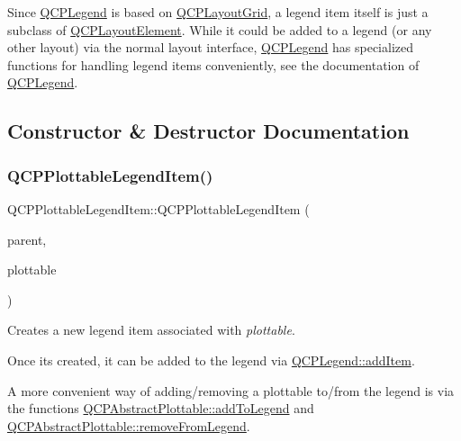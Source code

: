 Since \hyperlink{classQCPLegend}{Q\+C\+P\+Legend} is based on \hyperlink{classQCPLayoutGrid}{Q\+C\+P\+Layout\+Grid}, a legend item itself is just a subclass of \hyperlink{classQCPLayoutElement}{Q\+C\+P\+Layout\+Element}. While it could be added to a legend (or any other layout) via the normal layout interface, \hyperlink{classQCPLegend}{Q\+C\+P\+Legend} has specialized functions for handling legend items conveniently, see the documentation of \hyperlink{classQCPLegend}{Q\+C\+P\+Legend}. 

\subsection{Constructor \& Destructor Documentation}
\mbox{\label{classQCPPlottableLegendItem_ac1072591fe409d3dabad51b23ee4d6c5}} 
\subsubsection{\texorpdfstring{Q\+C\+P\+Plottable\+Legend\+Item()}{QCPPlottableLegendItem()}}
{\footnotesize\ttfamily Q\+C\+P\+Plottable\+Legend\+Item\+::\+Q\+C\+P\+Plottable\+Legend\+Item (\begin{DoxyParamCaption}\item[{\hyperlink{classQCPLegend}{Q\+C\+P\+Legend} $\ast$}]{parent,  }\item[{\hyperlink{classQCPAbstractPlottable}{Q\+C\+P\+Abstract\+Plottable} $\ast$}]{plottable }\end{DoxyParamCaption})}

Creates a new legend item associated with {\itshape plottable}.

Once it\textquotesingle{}s created, it can be added to the legend via \hyperlink{classQCPLegend_a3ab274de52d2951faea45a6d975e6b3f}{Q\+C\+P\+Legend\+::add\+Item}.

A more convenient way of adding/removing a plottable to/from the legend is via the functions \hyperlink{classQCPAbstractPlottable_aa64e93cb5b606d8110d2cc0a349bb30f}{Q\+C\+P\+Abstract\+Plottable\+::add\+To\+Legend} and \hyperlink{classQCPAbstractPlottable_a3cc235007e2343a65ad4f463767e0e20}{Q\+C\+P\+Abstract\+Plottable\+::remove\+From\+Legend}. 

